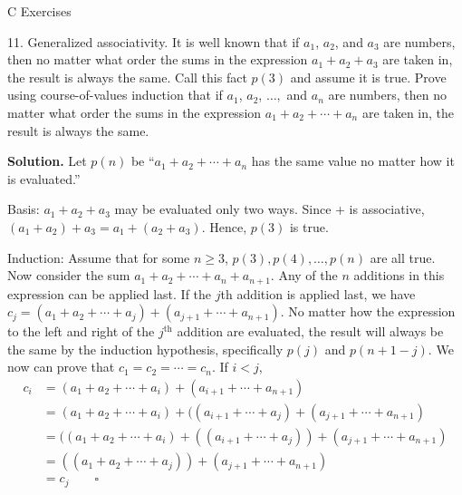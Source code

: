 \documentclass[10pt,]{book}
\theoremstyle{plain}
\theoremstyle{definition}
\theoremstyle{definition}
\theoremstyle{definition}
\theoremstyle{definition}
\begin{document}
\par\smallskip\noindent
\hypertarget{exercisegroup-11}{}\typeout{************************************************}
\typeout{************************************************}
C Exercises%
\begin{exercisegroup}
\item[11.]\hypertarget{exercise-48}{} Generalized associativity. It is well known that if \(a_1\), \(a_2\), and \(a_3\) are numbers, then no matter what order the sums in the expression \(a_1+ a_2+a_3\) are taken in, the result is always the same. Call this fact \(p(3)\) and assume it is true. Prove using course-of-values induction that if \(a_1\), \(a_2\), \(\ldots ,\) and \(a_n\)  are numbers, then no matter what order the sums in the expression \(a_1+ a_2+\cdots +a_n\) are taken in, the result is always the same.
%
\par\smallskip
\par\smallskip
\noindent\textbf{Solution.}\hypertarget{solution-5}{}\quad
 Let \(p(n)\) be ``\(a_{1} + a_2 + \cdots + a_n\) has the same value no matter how it is evaluated.''%
\par
 Basis: \(a_1 + a_2 + a_3\) may be evaluated only two ways. Since + is associative, \((a_1 + a_2) + a_3 = a_1 + (a_2 + a_3)\). Hence, \(p(3)\) is true.%
\par
Induction: Assume that for some \( n\geq 3\), \(p(3), p(4), \dots , p(n)\) are all true. Now consider the sum \(a_1 + a_2 + \cdots + a_n + a_{n+1}\). Any of the \(n\) additions in this expression can be applied last. If the \(j\)th addition is applied last, we have \(c_j=(a_1+a_2+\cdots +a_j)+(a_{j+1}+\cdots +a_{n+1})\). No matter how the expression to the left and right of the \(j^{\text{th}}\) addition are evaluated, the result will always be the same by the induction hypothesis, specifically \(p(j)\) and \(p(n+1-j)\). We now can prove that \(c_1=c_2=\cdots =c_n\). If \(i < j\), 
 \begin{equation*}
\begin{split}
c_i &=(a_1+a_2+\cdots +a_i)+(a_{i+1}+\cdots +a_{n+1})\\
	&=(a_1+a_2+\cdots +a_i)+((a_{i+1}+\cdots +a_j)+(a_{j+1}+\cdots +a_{n+1})\\
	&=((a_1+a_2+\cdots +a_i)+((a_{i+1}+\cdots +a_j))+(a_{j+1}+\cdots +a_{n+1})\\
	&=((a_1+a_2+\cdots +a_j))+(a_{j+1}+\cdots +a_{n+1})\\
	&=c_j \quad\quad \square
\end{split}
\end{equation*}

\end{exercisegroup}
\end{document}
